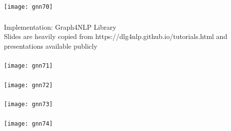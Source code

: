 \begin{frame}[fragile]\frametitle{}

\begin{center}
\texttt{[image: gnn70]}
\end{center}	  

\end{frame}

\begin{frame}[fragile]\frametitle{}
\begin{center}
{\Large Implementation: Graph4NLP Library} \\
{\small Slides are heavily copied from https://dlg4nlp.github.io/tutorials.html and presentations available publicly}
\end{center}
\end{frame}

\begin{frame}[fragile]\frametitle{}

\begin{center}
\texttt{[image: gnn71]}
\end{center}	  

\end{frame}

\begin{frame}[fragile]\frametitle{}

\begin{center}
\texttt{[image: gnn72]}
\end{center}	  

\end{frame}

\begin{frame}[fragile]\frametitle{}

\begin{center}
\texttt{[image: gnn73]}
\end{center}	  

\end{frame}

\begin{frame}[fragile]\frametitle{}

\begin{center}
\texttt{[image: gnn74]}
\end{center}	  

\end{frame}

